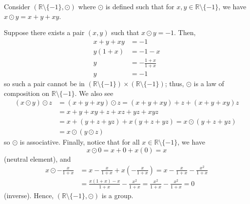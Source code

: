 \begin{exer}
Consider $ (\mathbb{R}\setminus\{-1\},\odot) $ where $ \odot $ is defined such that for $ x,y\in\mathbb{R}\setminus\{-1\} $, we have $ x\odot y=x+y+xy $.
\end{exer}
\begin{sltn}
Suppose there exists a pair $ (x,y) $ such that $ x\odot y=-1 $. Then,
\begin{align*}
    x+y+xy &= -1 \\
    y(1+x) &= -1-x \\
    y &= -\frac{1+x}{1+x} \\
    y &= -1
\end{align*}
so such a pair cannot be in $ (\mathbb{R}\setminus\{-1\})\times(\mathbb{R}\setminus\{-1\}) $; thus, $ \odot $ is a law of composition on $ \mathbb{R}\setminus\{-1\} $. We also see
\begin{align*}
    (x\odot y)\odot z &= (x+y+xy)\odot z=(x+y+xy)+z+(x+y+xy)z \\
    &= x+y+xy+z+xz+yz+xyz \\
    &= x+(y+z+yz)+x(y+z+yz)=x\odot(y+z+yz) \\
    &= x\odot(y\odot z)
\end{align*}
so $ \odot $ is associative. Finally, notice that for all $ x\in\mathbb{R}\setminus\{-1\} $, we have
\begin{equation*}
    x\odot 0=x+0+x(0)=x
\end{equation*}
(neutral element), and
\begin{align*}
    x\odot -\frac{x}{1+x} &= x-\frac{x}{1+x}+x\left(-\frac{x}{1+x}\right)=x-\frac{x}{1+x}-\frac{x^2}{1+x} \\
    &= \frac{x(1+x)-x}{1+x}-\frac{x^2}{1+x}=\frac{x^2}{1+x}-\frac{x^2}{1+x}=0
\end{align*}
(inverse). Hence, $ (\mathbb{R}\setminus\{-1\},\odot) $ is a group.
\end{sltn}

